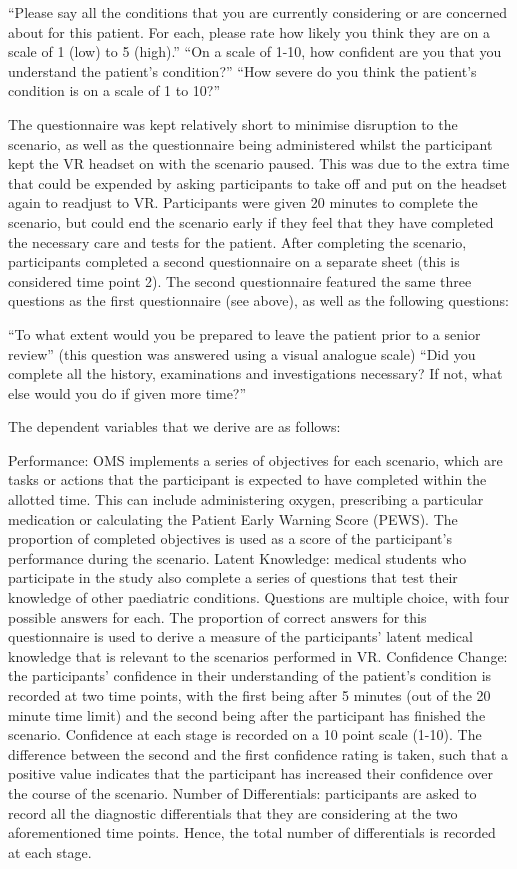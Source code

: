 \documentclass[a4paper, nobind]{templates/ociamthesis}
\begin{document}
``Please say all the conditions that you are currently considering or are concerned about for this patient. For each, please rate how likely you think they are on a scale of 1 (low) to 5 (high).''
``On a scale of 1-10, how confident are you that you understand the patient's condition?''
``How severe do you think the patient's condition is on a scale of 1 to 10?''

The questionnaire was kept relatively short to minimise disruption to the scenario, as well as the questionnaire being administered whilst the participant kept the VR headset on with the scenario paused. This was due to the extra time that could be expended by asking participants to take off and put on the headset again to readjust to VR. Participants were given 20 minutes to complete the scenario, but could end the scenario early if they feel that they have completed the necessary care and tests for the patient. After completing the scenario, participants completed a second questionnaire on a separate sheet (this is considered time point 2). The second questionnaire featured the same three questions as the first questionnaire (see above), as well as the following questions:

``To what extent would you be prepared to leave the patient prior to a senior review'' (this question was answered using a visual analogue scale)
``Did you complete all the history, examinations and investigations necessary? If not, what else would you do if given more time?''

The dependent variables that we derive are as follows:

Performance: OMS implements a series of objectives for each scenario, which are tasks or actions that the participant is expected to have completed within the allotted time. This can include administering oxygen, prescribing a particular medication or calculating the Patient Early Warning Score (PEWS). The proportion of completed objectives is used as a score of the participant's performance during the scenario.
Latent Knowledge: medical students who participate in the study also complete a series of questions that test their knowledge of other paediatric conditions. Questions are multiple choice, with four possible answers for each. The proportion of correct answers for this questionnaire is used to derive a measure of the participants' latent medical knowledge that is relevant to the scenarios performed in VR.
Confidence Change: the participants' confidence in their understanding of the patient's condition is recorded at two time points, with the first being after 5 minutes (out of the 20 minute time limit) and the second being after the participant has finished the scenario. Confidence at each stage is recorded on a 10 point scale (1-10). The difference between the second and the first confidence rating is taken, such that a positive value indicates that the participant has increased their confidence over the course of the scenario.
Number of Differentials: participants are asked to record all the diagnostic differentials that they are considering at the two aforementioned time points. Hence, the total number of differentials is recorded at each stage.
\end{document}
